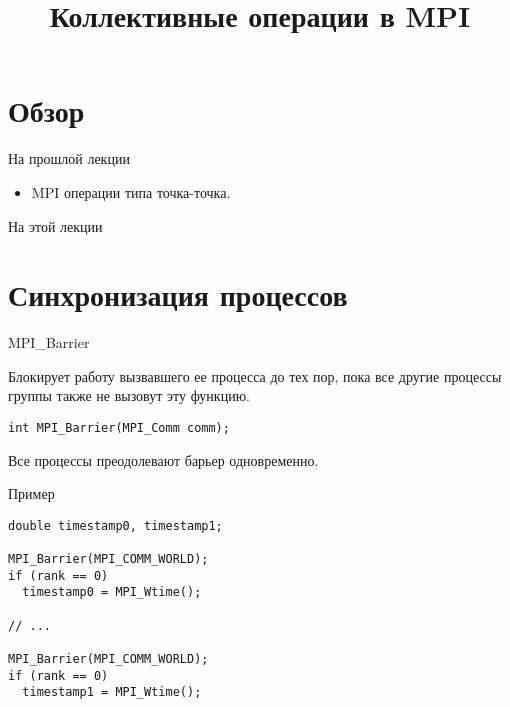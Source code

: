 

\title{Коллективные операции в MPI}



\begin{frame}
\titlepage
\end{frame}

\section*{Обзор}

\begin{frame}{На прошлой лекции}

\begin{itemize}
  \item MPI операции типа точка-точка.
\end{itemize}

\end{frame}

\begin{frame}{На этой лекции}
\tableofcontents
\end{frame} 


\section{Синхронизация процессов}

\begin{frame}[fragile]{MPI_Barrier}

Блокирует работу вызвавшего ее процесса до тех пор, пока все другие процессы группы также не вызовут эту функцию.

\begin{lstlisting}
int MPI_Barrier(MPI_Comm comm);
\end{lstlisting}

Все процессы преодолевают барьер одновременно.

\end{frame}

\begin{frame}[fragile]{Пример}

\begin{lstlisting}
double timestamp0, timestamp1;

MPI_Barrier(MPI_COMM_WORLD);
if (rank == 0)
  timestamp0 = MPI_Wtime();

// ...

MPI_Barrier(MPI_COMM_WORLD);
if (rank == 0)
  timestamp1 = MPI_Wtime();
\end{lstlisting}

\end{frame}

